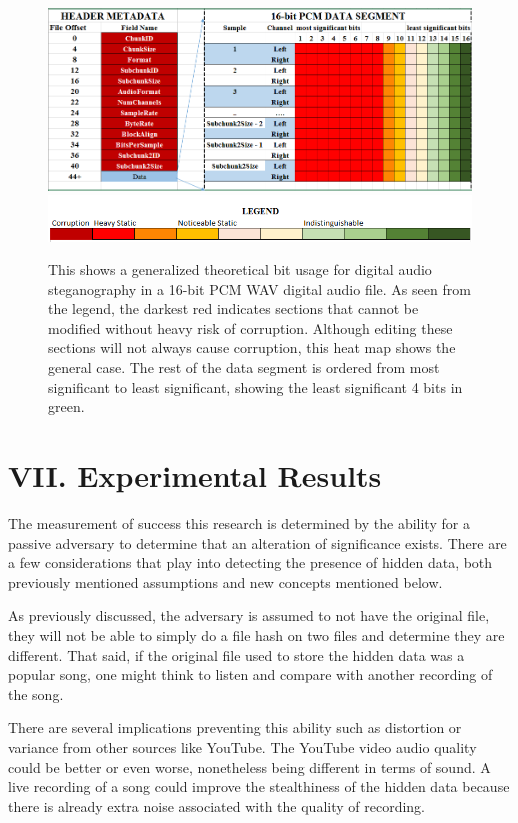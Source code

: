 \documentclass[letterpaper]{article}
\begin{document}
\begin{figure}[ht]
    \centering
    \includegraphics[width=13cm]{images/heat.png}
    \includegraphics[width=13cm]{images/heatlegend.png}
    \caption{This shows a generalized theoretical bit usage for digital audio steganography in a 16-bit PCM WAV digital audio file. As seen from the legend, the darkest red indicates sections that cannot be modified without heavy risk of corruption. Although editing these sections will not always cause corruption, this heat map shows the general case. The rest of the data segment is ordered from most significant to least significant, showing the least significant 4 bits in green.
 }
    \label{fig:heatmap}
\end{figure}

\section{VII. Experimental Results}
The measurement of success this research is determined by the ability for a passive adversary to determine that an alteration of significance exists. There are a few considerations that play into detecting the presence of hidden data, both previously mentioned assumptions and new concepts mentioned below. 

As previously discussed, the adversary is assumed to not have the original file, they will not be able to simply do a file hash on two files and determine they are different. That said, if the original file used to store the hidden data was a popular song, one might think to listen and compare with another recording of the song. 

There are several implications preventing this ability such as distortion or variance from other sources like YouTube. The YouTube video audio quality could be better or even worse, nonetheless being different in terms of sound. A live recording of a song could improve the stealthiness of the hidden data because there is already extra noise associated with the quality of recording.  
\end{document}
